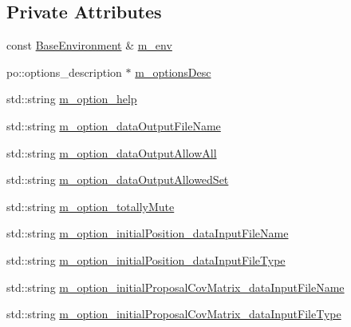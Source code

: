 \subsection*{Private Attributes}
\begin{DoxyCompactItemize}
\item 
const \hyperlink{class_q_u_e_s_o_1_1_base_environment}{Base\-Environment} \& \hyperlink{class_q_u_e_s_o_1_1_metropolis_hastings_s_g_options_a328a978b771885e14d536272ff4aa9ef}{m\-\_\-env}
\item 
po\-::options\-\_\-description $\ast$ \hyperlink{class_q_u_e_s_o_1_1_metropolis_hastings_s_g_options_a1a2cf22fbccd0bac761d9ee610edc16f}{m\-\_\-options\-Desc}
\item 
std\-::string \hyperlink{class_q_u_e_s_o_1_1_metropolis_hastings_s_g_options_af73e79036b108974843e26bc036c70ce}{m\-\_\-option\-\_\-help}
\item 
std\-::string \hyperlink{class_q_u_e_s_o_1_1_metropolis_hastings_s_g_options_ae5efdb40f8282073ebcad5892af4be44}{m\-\_\-option\-\_\-data\-Output\-File\-Name}
\item 
std\-::string \hyperlink{class_q_u_e_s_o_1_1_metropolis_hastings_s_g_options_a6d1f0f09fa5e238a54c6269c48fc6b29}{m\-\_\-option\-\_\-data\-Output\-Allow\-All}
\item 
std\-::string \hyperlink{class_q_u_e_s_o_1_1_metropolis_hastings_s_g_options_a7d12ea603c8aba9215ad462d51720204}{m\-\_\-option\-\_\-data\-Output\-Allowed\-Set}
\item 
std\-::string \hyperlink{class_q_u_e_s_o_1_1_metropolis_hastings_s_g_options_adc30bd8388e2da2b063671fc5ccad850}{m\-\_\-option\-\_\-totally\-Mute}
\item 
std\-::string \hyperlink{class_q_u_e_s_o_1_1_metropolis_hastings_s_g_options_a2dbb00eec372f529d21f770b0f220bd9}{m\-\_\-option\-\_\-initial\-Position\-\_\-data\-Input\-File\-Name}
\item 
std\-::string \hyperlink{class_q_u_e_s_o_1_1_metropolis_hastings_s_g_options_ad997674bedeb76faf75773dc8c3dfd17}{m\-\_\-option\-\_\-initial\-Position\-\_\-data\-Input\-File\-Type}
\item 
std\-::string \hyperlink{class_q_u_e_s_o_1_1_metropolis_hastings_s_g_options_a9d80faf22cf4d5614819ae5259463e89}{m\-\_\-option\-\_\-initial\-Proposal\-Cov\-Matrix\-\_\-data\-Input\-File\-Name}
\item 
std\-::string \hyperlink{class_q_u_e_s_o_1_1_metropolis_hastings_s_g_options_a00116cfe535c1bea24a321f76c8c501a}{m\-\_\-option\-\_\-initial\-Proposal\-Cov\-Matrix\-\_\-data\-Input\-File\-Type}

\end{DoxyCompactItemize}
